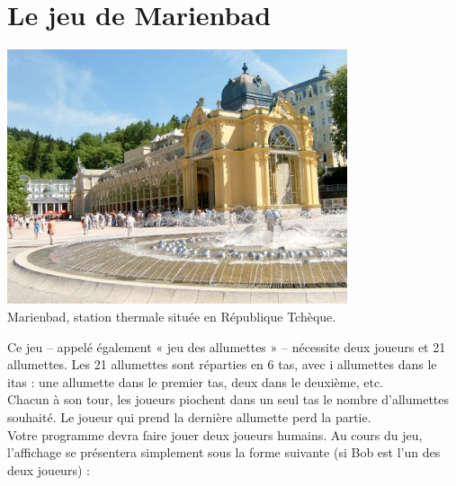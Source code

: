 \documentclass[a4paper,12pt,french]{book}
\begin{document}
\chapter*{Le jeu de Marienbad}

\begin{center}
    \includegraphics[width = 10cm]{img/marienbad}\\
    \footnotesize Marienbad, station thermale située en République Tchèque.
\end{center}

Ce jeu – appelé également « jeu des allumettes » – nécessite deux joueurs et 21
allumettes. Les 21 allumettes sont réparties en 6 tas, avec i allumettes dans le i\eme tas : une allumette
dans le premier tas, deux dans le deuxième, etc.\\
Chacun à son tour, les joueurs piochent dans un seul tas le nombre d’allumettes
souhaité. Le joueur qui prend la dernière allumette perd la partie.\\

Votre programme devra faire jouer deux joueurs humains. Au cours du jeu, l’affichage se
présentera simplement sous la forme suivante (si Bob est l’un des deux joueurs) :\\

\end{document}
